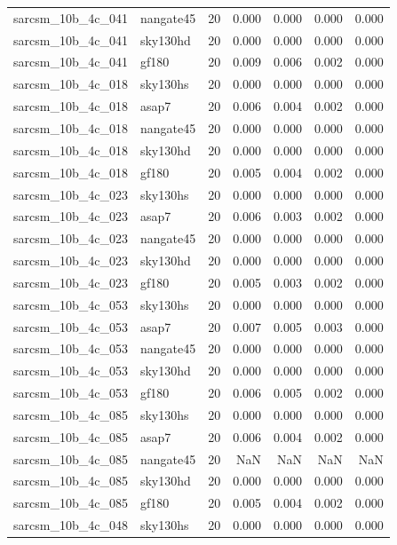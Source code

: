 \begin{tabular}{llrrrrr}
sarcsm\_10b\_4c\_041 & nangate45 & 20 & 0.000 & 0.000 & 0.000 & 0.000 \\
sarcsm\_10b\_4c\_041 & sky130hd & 20 & 0.000 & 0.000 & 0.000 & 0.000 \\
sarcsm\_10b\_4c\_041 & gf180 & 20 & 0.009 & 0.006 & 0.002 & 0.000 \\
sarcsm\_10b\_4c\_018 & sky130hs & 20 & 0.000 & 0.000 & 0.000 & 0.000 \\
sarcsm\_10b\_4c\_018 & asap7 & 20 & 0.006 & 0.004 & 0.002 & 0.000 \\
sarcsm\_10b\_4c\_018 & nangate45 & 20 & 0.000 & 0.000 & 0.000 & 0.000 \\
sarcsm\_10b\_4c\_018 & sky130hd & 20 & 0.000 & 0.000 & 0.000 & 0.000 \\
sarcsm\_10b\_4c\_018 & gf180 & 20 & 0.005 & 0.004 & 0.002 & 0.000 \\
sarcsm\_10b\_4c\_023 & sky130hs & 20 & 0.000 & 0.000 & 0.000 & 0.000 \\
sarcsm\_10b\_4c\_023 & asap7 & 20 & 0.006 & 0.003 & 0.002 & 0.000 \\
sarcsm\_10b\_4c\_023 & nangate45 & 20 & 0.000 & 0.000 & 0.000 & 0.000 \\
sarcsm\_10b\_4c\_023 & sky130hd & 20 & 0.000 & 0.000 & 0.000 & 0.000 \\
sarcsm\_10b\_4c\_023 & gf180 & 20 & 0.005 & 0.003 & 0.002 & 0.000 \\
sarcsm\_10b\_4c\_053 & sky130hs & 20 & 0.000 & 0.000 & 0.000 & 0.000 \\
sarcsm\_10b\_4c\_053 & asap7 & 20 & 0.007 & 0.005 & 0.003 & 0.000 \\
sarcsm\_10b\_4c\_053 & nangate45 & 20 & 0.000 & 0.000 & 0.000 & 0.000 \\
sarcsm\_10b\_4c\_053 & sky130hd & 20 & 0.000 & 0.000 & 0.000 & 0.000 \\
sarcsm\_10b\_4c\_053 & gf180 & 20 & 0.006 & 0.005 & 0.002 & 0.000 \\
sarcsm\_10b\_4c\_085 & sky130hs & 20 & 0.000 & 0.000 & 0.000 & 0.000 \\
sarcsm\_10b\_4c\_085 & asap7 & 20 & 0.006 & 0.004 & 0.002 & 0.000 \\
sarcsm\_10b\_4c\_085 & nangate45 & 20 & NaN & NaN & NaN & NaN \\
sarcsm\_10b\_4c\_085 & sky130hd & 20 & 0.000 & 0.000 & 0.000 & 0.000 \\
sarcsm\_10b\_4c\_085 & gf180 & 20 & 0.005 & 0.004 & 0.002 & 0.000 \\
sarcsm\_10b\_4c\_048 & sky130hs & 20 & 0.000 & 0.000 & 0.000 & 0.000 \\

\end{tabular}
